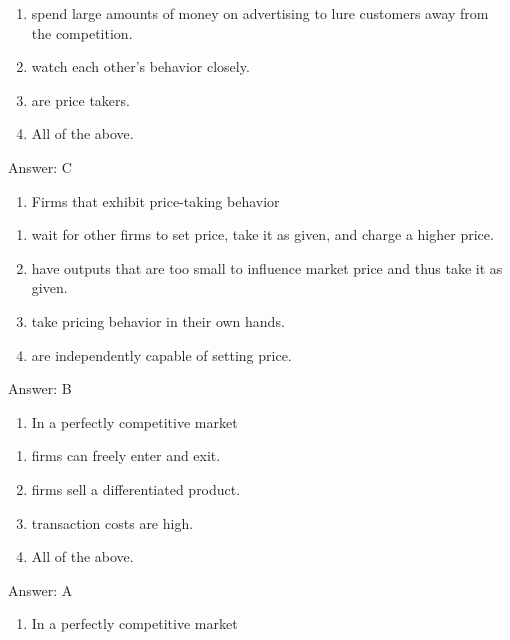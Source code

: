 \documentclass[11pt,]{article}
\providecommand{\tightlist}{%
  \setlength{\itemsep}{0pt}\setlength{\parskip}{0pt}}
\begin{document}
\begin{enumerate}
\def\labelenumi{\Alph{enumi})}
\tightlist
\item
  spend large amounts of money on advertising to lure customers away
  from the competition.
\item
  watch each other's behavior closely.
\item
  are price takers.
\item
  All of the above.
\end{enumerate}

Answer: C

\begin{enumerate}
\def\labelenumi{\arabic{enumi})}
\setcounter{enumi}{11}
\tightlist
\item
  Firms that exhibit price-taking behavior
\end{enumerate}

\begin{enumerate}
\def\labelenumi{\Alph{enumi})}
\tightlist
\item
  wait for other firms to set price, take it as given, and charge a
  higher price.
\item
  have outputs that are too small to influence market price and thus
  take it as given.
\item
  take pricing behavior in their own hands.
\item
  are independently capable of setting price.
\end{enumerate}

Answer: B

\begin{enumerate}
\def\labelenumi{\arabic{enumi})}
\setcounter{enumi}{12}
\tightlist
\item
  In a perfectly competitive market
\end{enumerate}

\begin{enumerate}
\def\labelenumi{\Alph{enumi})}
\tightlist
\item
  firms can freely enter and exit.
\item
  firms sell a differentiated product.
\item
  transaction costs are high.
\item
  All of the above.
\end{enumerate}

Answer: A

\begin{enumerate}
\def\labelenumi{\arabic{enumi})}
\setcounter{enumi}{13}
\tightlist
\item
  In a perfectly competitive market
\end{enumerate}
\end{document}
